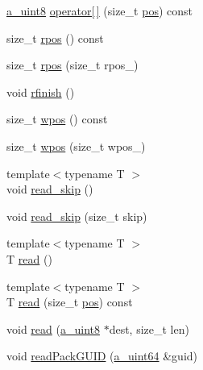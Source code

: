 \begin{DoxyCompactItemize}
\item 
\hyperlink{_common_defines_8h_afbe6c09973474a1f78f870f39073398f}{a\+\_\+uint8} \hyperlink{class_agmd_network_1_1_byte_buffer_a1b9f23f0fc66002af7942810d05f3106}{operator\mbox{[}$\,$\mbox{]}} (size\+\_\+t \hyperlink{_examples_2_planet_2_app_8cpp_aa8a1c0491559faca4ebd0881575ae7f0}{pos}) const 
\item 
size\+\_\+t \hyperlink{class_agmd_network_1_1_byte_buffer_a9828e2a90807d2dd1830cdb81f579dd8}{rpos} () const 
\item 
size\+\_\+t \hyperlink{class_agmd_network_1_1_byte_buffer_acc9edd1926d27066cf240e0dcad92d9a}{rpos} (size\+\_\+t rpos\+\_\+)
\item 
void \hyperlink{class_agmd_network_1_1_byte_buffer_a3d1ff0bbbef78b47eece2408f0f243e7}{rfinish} ()
\item 
size\+\_\+t \hyperlink{class_agmd_network_1_1_byte_buffer_a94b66c0a3dc6b8436f2ff909f4f37b81}{wpos} () const 
\item 
size\+\_\+t \hyperlink{class_agmd_network_1_1_byte_buffer_abb98f0f0559e4dd085945e48c01e262c}{wpos} (size\+\_\+t wpos\+\_\+)
\item 
{\footnotesize template$<$typename T $>$ }\\void \hyperlink{class_agmd_network_1_1_byte_buffer_ace4e9f14fd7c888de72b85cb241f2980}{read\+\_\+skip} ()
\item 
void \hyperlink{class_agmd_network_1_1_byte_buffer_a2b1bfa93e11a2c1a13a38f041ad21240}{read\+\_\+skip} (size\+\_\+t skip)
\item 
{\footnotesize template$<$typename T $>$ }\\T \hyperlink{class_agmd_network_1_1_byte_buffer_aecba00f1eb22eaa26233cd862ccf95de}{read} ()
\item 
{\footnotesize template$<$typename T $>$ }\\T \hyperlink{class_agmd_network_1_1_byte_buffer_ac5a4047c9a047c1cd1354687d23d970f}{read} (size\+\_\+t \hyperlink{_examples_2_planet_2_app_8cpp_aa8a1c0491559faca4ebd0881575ae7f0}{pos}) const 
\item 
void \hyperlink{class_agmd_network_1_1_byte_buffer_a32544dcf9beaa6a471ec5849095fd5b8}{read} (\hyperlink{_common_defines_8h_afbe6c09973474a1f78f870f39073398f}{a\+\_\+uint8} $\ast$dest, size\+\_\+t len)
\item 
void \hyperlink{class_agmd_network_1_1_byte_buffer_ad2b2299f2aaaff825adf342d258bf65d}{read\+Pack\+G\+U\+I\+D} (\hyperlink{_common_defines_8h_a6c5192ec3c55d6e5b13d2dbaa082bdea}{a\+\_\+uint64} \&guid)
\item 

\end{DoxyCompactItemize}
